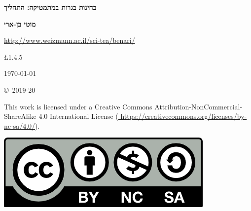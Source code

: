 

\thispagestyle{empty}

\begin{center}
\textbf{\LARGE בחינות בגרות במתמטיקה: התהליך}
\end{center}

\bigskip
\bigskip

\begin{center}
\textbf{\Large מוטי בן-ארי}

\bigskip

\url{http://www.weizmann.ac.il/sci-tea/benari/}
\end{center}

\begin{center}	
\begin{bfseries}
\bigskip
\bigskip

 \L{1.4.5} 

\bigskip

\today

\end{bfseries}
\end{center}

\vfill


\begin{small}
\begin{center}
\copyright{}\ 2019-20 
\end{center}
This work is licensed under a Creative Commons Attribution-NonCommercial-ShareAlike 4.0 International License (\url{
https://creativecommons.org/licenses/by-nc-sa/4.0/}).
\end{small}

\bigskip

\begin{center}
\includegraphics[width=.3\textwidth]{../../by-nc-sa.png}
\end{center}

\np

\thispagestyle{empty}

\mbox{}

\np

\thispagestyle{empty}

\tableofcontents

